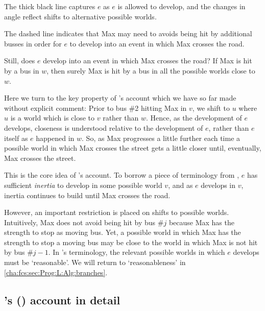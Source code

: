 \begin{note}
  The thick black line captures \(e\) as \(e\) is allowed to develop, and the changes in angle reflect shifts to alternative possible worlds.

  The dashed line indicates that Max may need to avoids being hit by additional busses in order for \(e\) to develop into an event in which Max crosses the road.

  Still, does \(e\) develop into an event in which Max crosses the road?
  If Max is hit by a bus in \(w\), then surely Max is hit by a bus in all the possible worlds close to \(w\).

  Here we turn to the key property of \citeauthor{Landman:1992wh}'s account which we have so far made without explicit comment:
  Prior to bus \#2 hitting Max in \(v\), we shift to \(u\) where \(u\) is a world which is close to \(v\) rather than \(w\).
  Hence, as the development of \(e\) develops, closeness is understood relative to the development of \(e\), rather than \(e\) itself as \(e\) happened in \(w\).
  So, as Max progresses a little further each time a possible world in which Max crosses the street gets a little closer until, eventually, Max crosses the street.

  This is the core idea of \citeauthor{Landman:1992wh}'s account.
  To borrow a piece of terminology from \textcite{Dowty:1979vq}, \(e\) has sufficient \emph{inertia} to develop in some possible world \(v\), and as \(e\) develops in \(v\), inertia continues to build until Max crosses the road.

  However, an important restriction is placed on shifts to possible worlds.
  Intuitively, Max does not avoid being hit by bus \#\(j\) because Max has the strength to stop as moving bus.
  Yet, a possible world in which Max has the strength to stop a moving bus may be close to the world in which Max is not hit by bus \#\(j - 1\).
  In \citeauthor{Landman:1992wh}'s terminology, the relevant possible worlds in which \(e\) develops must be `reasonable'.
  We will return to `reasonableness' in \autoref{cha:fcs:sec:Prog:L:Alg:branches}.
\end{note}

\subsection[\citeauthor{Landman:1992wh}~(\citeyear{Landman:1992wh})]{\citeauthor{Landman:1992wh}'s (\citeyear{Landman:1992wh}) account in detail}
\label{cha:fcs:sec:Landman:details}

